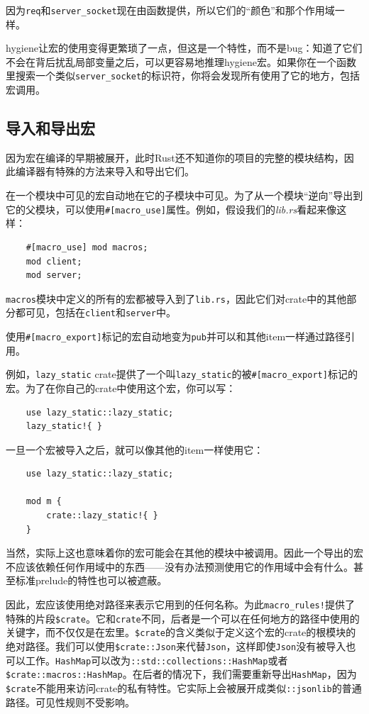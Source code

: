 因为\texttt{req}和\texttt{server\_socket}现在由函数提供，所以它们的“颜色”和那个作用域一样。

hygiene让宏的使用变得更繁琐了一点，但这是一个特性，而不是bug：知道了它们不会在背后扰乱局部变量之后，可以更容易地推理hygiene宏。如果你在一个函数里搜索一个类似\texttt{server\_socket}的标识符，你将会发现所有使用了它的地方，包括宏调用。

\subsection{导入和导出宏}
因为宏在编译的早期被展开，此时Rust还不知道你的项目的完整的模块结构，因此编译器有特殊的方法来导入和导出它们。

在一个模块中可见的宏自动地在它的子模块中可见。为了从一个模块“逆向”导出到它的父模块，可以使用\texttt{\#[macro\_use]}属性。例如，假设我们的\emph{lib.rs}看起来像这样：
\begin{verbatim}
    #[macro_use] mod macros;
    mod client;
    mod server;
\end{verbatim}

\texttt{macros}模块中定义的所有的宏都被导入到了\texttt{lib.rs}，因此它们对crate中的其他部分都可见，包括在\texttt{client}和\texttt{server}中。

使用\texttt{\#[macro\_export]}标记的宏自动地变为\texttt{pub}并可以和其他item一样通过路径引用。

例如，\texttt{lazy\_static} crate提供了一个叫\texttt{lazy\_static}的被\texttt{\#[macro\_export]}标记的宏。为了在你自己的crate中使用这个宏，你可以写：
\begin{verbatim}
    use lazy_static::lazy_static;
    lazy_static!{ }
\end{verbatim}
一旦一个宏被导入之后，就可以像其他的item一样使用它：
\begin{verbatim}
    use lazy_static::lazy_static;

    mod m {
        crate::lazy_static!{ }
    }
\end{verbatim}

当然，实际上这也意味着你的宏可能会在其他的模块中被调用。因此一个导出的宏不应该依赖任何作用域中的东西——没有办法预测使用它的作用域中会有什么。甚至标准prelude的特性也可以被遮蔽。

因此，宏应该使用绝对路径来表示它用到的任何名称。为此\texttt{macro\_rules!}提供了特殊的片段\texttt{\$crate}。它和\texttt{crate}不同，后者是一个可以在任何地方的路径中使用的关键字，而不仅仅是在宏里。\texttt{\$crate}的含义类似于定义这个宏的crate的根模块的绝对路径。我们可以使用\texttt{\$crate::Json}来代替\texttt{Json}，这样即使\texttt{Json}没有被导入也可以工作。\texttt{HashMap}可以改为\texttt{::std::collections::HashMap}或者\texttt{\$crate::macros::HashMap}。在后者的情况下，我们需要重新导出\texttt{HashMap}，因为\texttt{\$crate}不能用来访问crate的私有特性。它实际上会被展开成类似\texttt{::jsonlib}的普通路径。可见性规则不受影响。

